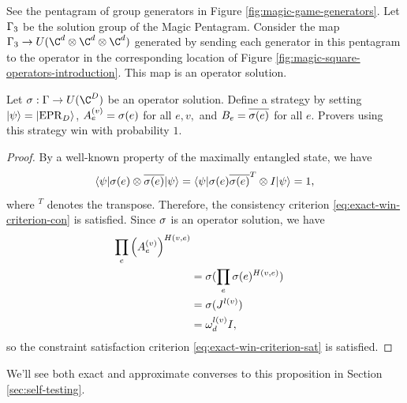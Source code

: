 \begin{example}
See the pentagram of group generators in Figure \ref{fig:magic-game-generators}. Let $\Gamma_3$ be the solution group of the Magic Pentagram. Consider the map $\G_3 \to U(\C^d\otimes \C^d\otimes\C^d)$ generated by sending each generator in this pentagram to the operator in the corresponding location of Figure \ref{fig:magic-square-operators-introduction}. This map is an operator solution.
\end{example}


\begin{prop}
\label{prop: perfect strategy}
	Let $\s: \G \to U(\C^D)$ be an operator solution. Define a strategy by setting $\ket\psi = \ket{\mathrm{EPR}_D}$, $A_e^{(v)} = \sigma(e)$ for all $e,v,$ and $B_e = \overline{\sigma(e)}$ for all $e$. Provers using this strategy win with probability $1$.
\end{prop}
\begin{proof}
	By a well-known property of the maximally entangled state, we have
	\begin{equation}
		\braket{ \psi | \sigma(e) \otimes \overline{\sigma(e)} | \psi} = 
		\braket{ \psi | \sigma(e)\overline{\sigma(e)}^T \otimes I  | \psi} = 1,
	\end{equation}
	where $^T$ denotes the transpose. 
	Therefore, the consistency criterion \eqref{eq:exact-win-criterion-con} is satisfied.
	Since $\sigma$ is an operator solution, we have 
	\begin{align}
		\prod_{e} \left(A_e^{(v)}\right)^{H(v,e)} 
		\\&= \sigma(\prod_e \sigma(e)^{H(v,e)})
		\\&= \sigma(J^{l(v)}) 
		\\&=\omega_d^{l(v)}I,
	\end{align}
	so the constraint satisfaction criterion \eqref{eq:exact-win-criterion-sat} is satisfied.
\end{proof}

We'll see both exact and approximate converses to this proposition in Section \ref{sec:self-testing}.
